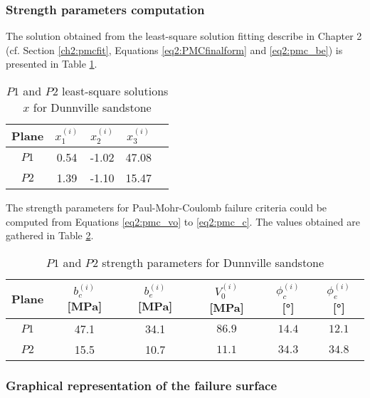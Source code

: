 \subsubsection{Strength parameters computation}

The solution obtained from the least-square solution fitting describe in Chapter 2 (cf. Section \ref{ch2:pmcfit}, Equations \ref{eq2:PMCfinalform} and \ref{eq2:pmc_be}) is presented in Table \ref{tb5:dunn_sol1}. 

\begin{table} [p]
    \centering 
    \captionsetup{justification=centering}
    \caption{$P1$ and $P2$ least-square solutions $x$ for Dunnville sandstone}
    \begin{tabular}{ccccc}
        \hline 
        Plane & $x_1^{(i)}$ & $x_2^{(i)}$ & $x_3^{(i)}$ \\
        \hline
        \hline
        $P1$ & 0.54 & -1.02 & 47.08 \\
        $P2$ & 1.39 & -1.10 & 15.47 \\
        \hline
    \end{tabular}
    \label{tb5:dunn_sol1}
\end{table}

The strength parameters for Paul-Mohr-Coulomb failure criteria could be computed from Equations \ref{eq2:pmc_vo} to \ref{eq2:pmc_c}. The values obtained are gathered in Table \ref{tb5:dunn_strpara}. 

\begin{table} [p]
    \centering 
    \captionsetup{justification=centering}
    \caption{$P1$ and $P2$ strength parameters for Dunnville sandstone}
    \begin{tabular}{cccccc}
        \hline 
        Plane & $b_c^{(i)}$ [\si{MPa}] & $b_e^{(i)}$ [\si{MPa}] & $V_0^{(i)}$ [\si{MPa}] & $\phi_c^{(i)}$ [\si{\degree}] & $\phi_e^{(i)}$ [\si{\degree}] \\
        \hline
        \hline
        $P1$ & 47.1 & 34.1 & $86.9$ & $14.4$ & $12.1$\\
        $P2$ & 15.5 & 10.7 & $11.1$ & $34.3$ & $34.8$ \\
        \hline
    \end{tabular}
    \label{tb5:dunn_strpara}
\end{table}

\subsubsection{Graphical representation of the failure surface}

